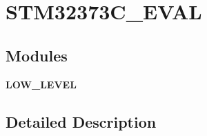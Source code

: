 \section{S\+T\+M32373\+C\+\_\+\+E\+V\+AL}
\label{group___s_t_m32373_c___e_v_a_l}
\subsection*{Modules}
\begin{DoxyCompactItemize}
\item 
\textbf{ L\+O\+W\+\_\+\+L\+E\+V\+EL}
\end{DoxyCompactItemize}


\subsection{Detailed Description}
